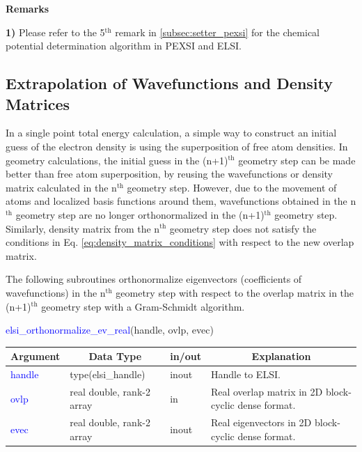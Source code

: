\documentclass{report}
\begin{document}
\textbf{Remarks}

\textbf{1)} Please refer to the 5$^\text{th}$ remark in \ref{subsec:setter_pexsi} for the chemical potential determination algorithm in PEXSI and ELSI.

\subsection{Extrapolation of Wavefunctions and Density Matrices}
\label{subsec:extrapolation}
In a single point total energy calculation, a simple way to construct an initial guess of the electron density is using the superposition of free atom densities. In geometry calculations, the initial guess in the (n+1)$^\text{th}$ geometry step can be made better than free atom superposition, by reusing the wavefunctions or density matrix calculated in the n$^\text{th}$ geometry step. However, due to the movement of atoms and localized basis functions around them, wavefunctions obtained in the n$^\text{th}$ geometry step are no longer orthonormalized in the (n+1)$^\text{th}$ geometry step. Similarly, density matrix from the n$^\text{th}$ geometry step does not satisfy the conditions in Eq. \ref{eq:density_matrix_conditions} with respect to the new overlap matrix.

The following subroutines orthonormalize eigenvectors (coefficients of wavefunctions) in the n$^\text{th}$ geometry step with respect to the overlap matrix in the (n+1)$^\text{th}$ geometry step with a Gram-Schmidt algorithm.
\begin{labeling}{\hspace{6cm}}
\item [\hspace{0.3cm} \textcolor{blue}{elsi\_orthonormalize\_ev\_real}(handle, ovlp, evec)]
\end{labeling}

\begin{tabular}[]{|p{20mm}|p{45mm}|p{15mm}|p{85mm}|}
\hline
\multicolumn{1}{|c|}{\textbf{Argument}} & \multicolumn{1}{c|}{\textbf{Data Type}} & \multicolumn{1}{c|}{\textbf{in/out}} & \multicolumn{1}{c|}{\textbf{Explanation}}\\
\hline
\textcolor{blue}{handle} & type(elsi\_handle)        & inout & Handle to ELSI.\\
\hline
\textcolor{blue}{ovlp}   & real double, rank-2 array & in    & Real overlap matrix in 2D block-cyclic dense format.\\
\hline
\textcolor{blue}{evec}   & real double, rank-2 array & inout & Real eigenvectors in 2D block-cyclic dense format.\\
\hline
\end{tabular}
\end{document}
